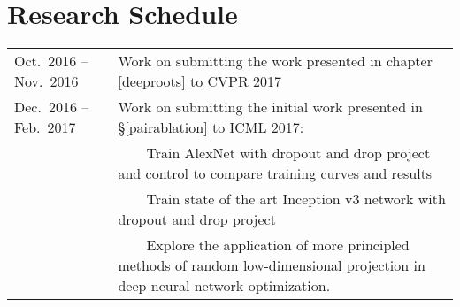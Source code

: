 \documentclass[thesis]{subfiles}
\begin{document}
\section{Research Schedule}

\newcommand{\tabitem}{~~\llap{\textbullet}~~}

\begin{table}
\centering
\begin{tabularx}{\textwidth}{lX}	
\toprule
Oct.\ 2016 -- Nov.\ 2016	&  Work on submitting the work presented in chapter \ref{deeproots} to CVPR 2017\\
Dec.\ 2016 -- Feb.\ 2017 	&  Work on submitting the initial work presented in \S\ref{pairablation} to ICML 2017:\\
& \tabitem Train AlexNet with dropout and drop project and control to compare training curves and results\\
& \tabitem Train state of the art Inception v3 network with dropout and drop project\\
& \tabitem Explore the application of more principled methods of random low-dimensional projection in deep neural network optimization.\\
\bottomrule
\end{tabularx} 
\end{table}
\end{document}
